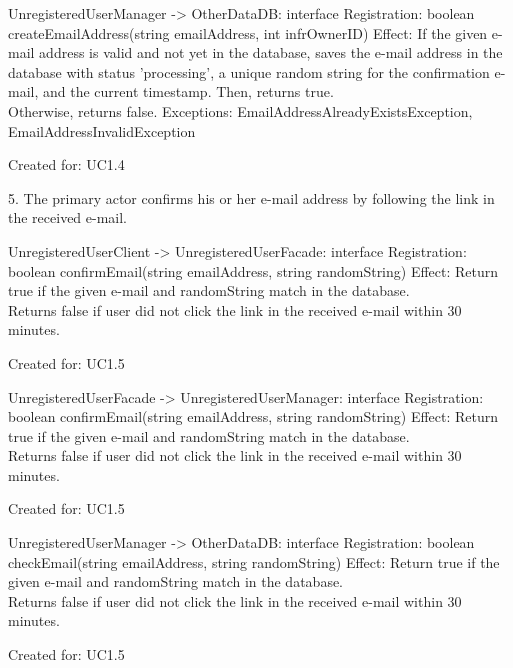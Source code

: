             UnregisteredUserManager -> OtherDataDB: interface Registration:
                                       boolean createEmailAddress(string emailAddress, int infrOwnerID)
                Effect: If the given e-mail address is valid and not yet in the database, saves the e-mail address
                        in the database with status 'processing', a unique random string for the confirmation e-mail,
                        and the current timestamp. Then, returns true. \\
                        Otherwise, returns false.
                Exceptions: EmailAddressAlreadyExistsException, EmailAddressInvalidException
                \item Created for: UC1.4

        5. The primary actor confirms his or her e-mail address by following the link in the received e-mail.

            UnregisteredUserClient -> UnregisteredUserFacade: interface Registration:
                                      boolean confirmEmail(string emailAddress, string randomString)
                Effect: Return true if the given e-mail and randomString match in the database. \\
                        Returns false if user did not click the link in the received e-mail within 30 minutes.
                \item Created for: UC1.5

            UnregisteredUserFacade -> UnregisteredUserManager: interface Registration:
                                      boolean confirmEmail(string emailAddress, string randomString)
                Effect: Return true if the given e-mail and randomString match in the database. \\
                        Returns false if user did not click the link in the received e-mail within 30 minutes.
                \item Created for: UC1.5

            UnregisteredUserManager -> OtherDataDB: interface Registration:
                                       boolean checkEmail(string emailAddress, string randomString)
                Effect: Return true if the given e-mail and randomString match in the database. \\
                        Returns false if user did not click the link in the received e-mail within 30 minutes.
                \item Created for: UC1.5

